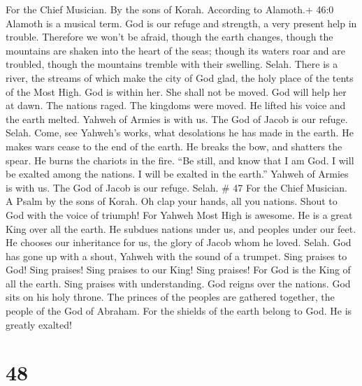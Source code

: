For the Chief Musician. By the sons of Korah. According to Alamoth.+
46:0 Alamoth is a musical term.  God is our refuge and
strength, a very present help in trouble.  Therefore we
won't be afraid, though the earth changes, though the mountains are
shaken into the heart of the seas;  though its waters roar
and are troubled, though the mountains tremble with their swelling.
Selah.  There is a river, the streams of which make the city
of God glad, the holy place of the tents of the Most High. 
God is within her. She shall not be moved. God will help her at dawn.
 The nations raged. The kingdoms were moved. He lifted his
voice and the earth melted.  Yahweh of Armies is with us.
The God of Jacob is our refuge. Selah.  Come, see Yahweh's
works, what desolations he has made in the earth.  He makes
wars cease to the end of the earth. He breaks the bow, and shatters the
spear. He burns the chariots in the fire.  ``Be still, and
know that I am God. I will be exalted among the nations. I will be
exalted in the earth.''  Yahweh of Armies is with us. The
God of Jacob is our refuge. Selah. \# 47 For the Chief Musician. A Psalm
by the sons of Korah.  Oh clap your hands, all you nations.
Shout to God with the voice of triumph!  For Yahweh Most
High is awesome. He is a great King over all the earth.  He
subdues nations under us, and peoples under our feet.  He
chooses our inheritance for us, the glory of Jacob whom he loved. Selah.
 God has gone up with a shout, Yahweh with the sound of a
trumpet.  Sing praises to God! Sing praises! Sing praises to
our King! Sing praises!  For God is the King of all the
earth. Sing praises with understanding.  God reigns over the
nations. God sits on his holy throne.  The princes of the
peoples are gathered together, the people of the God of Abraham. For the
shields of the earth belong to God. He is greatly exalted!

\hypertarget{section-46}{%
\section{48}\label{section-46}}

